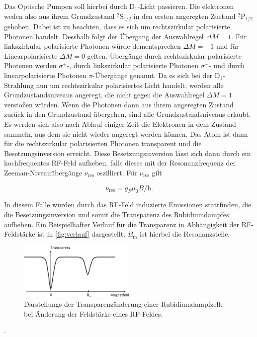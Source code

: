 \noindent
Das Optische Pumpen soll hierbei durch D$_1$-Licht passieren. Die elektronen weden also aus ihrem Grundzustand $^2$S$_{1/2}$ in den ersten angeregten
Zustand $^2$P$_{1/2}$ gehoben. Dabei ist zu beachten, dass es sich um rechtszirkular polarisierte Photonen handelt. Desshalb folgt der Übergang der
Auswahlregel $\Delta M = 1$. Für linkszirkular polarisierte Photonen würde dementsprechen $\Delta M=-1$ und für Linearpolarisierte $\Delta M=0$ gelten.
Übergänge durch rechtszirkular polarisierte Photenen werden $\sigma^+$-, durch linkszirkular polarisierte Photonen $\sigma^-$- und durch linearpolarisierte
Photonen $\pi$-Übergänge genannt.
\newline
Da es sich bei der D$_1$-Strahlung nun um rechtszirkular polarisiertes Licht handelt, werden alle Grundzustandsniveaus angeregt, die nicht gegen die Auswahlregel $\Delta M=1$
verstoßen würden. Wenn die Photonen dann aus ihrem angeregten Zustand zurück in den Grundzustand übergehen, sind alle Grundzustandsniveaus erlaubt. Es werden sich also nach
Ablauf einiger Zeit die Elektronen in dem Zustand sammeln, aus dem sie nicht wieder angeregt werden können. Das Atom ist dann für die rechtszirkular polarisierten Photonen
transparent und die Besetzungsinversion erreicht. Diese Besetzungsinversion lässt sich dann durch ein hochfrequentes RF-Feld aufheben, falls dieses mit der Resonanzfrequenz
der Zeeman-Niveauübergänge $\nu_\text{res}$ oszilliert. Für $\nu_\text{res}$ gilt

\begin{equation}
    \nu_\text{res}=g_F\mu_0B/\text{h}.
  \end{equation}

\noindent
In diesem Falle würden durch das RF-Feld induzierte Emissionen stattfinden, die die Besetzungsinversion und somit die Transparenz des Rubidiumdampfes aufheben.
Ein Beispielhafter Verlauf für die Transparenz in Abhängigkeit der RF-Feldstärke ist in \autoref{fig:verlauf} dargestellt. $B_\text{m}$ ist hierbei die Resonanzstelle.


\begin{figure}[H]
  \centering
  \includegraphics[width=0.5\textwidth]{data/Verlauf.png}
  \caption{Darstellungs der Transparenzänderung einer Rubidiumdampfzelle bei Änderung der Feldstärke eines RF-Feldes.}
  \label{fig:verlauf}
\end{figure}.


